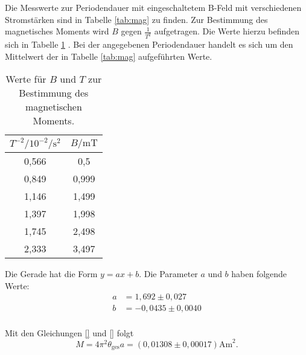 Die Messwerte zur Periodendauer mit eingeschaltetem B-Feld mit verschiedenen Stromstärken sind in Tabelle \ref{tab:mag} zu finden.
Zur Bestimmung des magnetisches Moments wird $B$ gegen $\frac{1}{T^2}$ aufgetragen. Die Werte hierzu befinden sich in Tabelle \ref{tab:mag2} . Bei der angegebenen Periodendauer handelt es sich um den Mittelwert der in Tabelle \ref{tab:mag} aufgeführten Werte.

\begin{table}
  \caption{Werte für $B$ und $T$ zur Bestimmung des magnetischen Moments.}
  \centering
  \label{tab:mag2}
  \begin{tabular}{c c }
    \toprule
    $T^{-2} / 10^{-2} {\si{\per\second\squared}}$ & $B/ \si{\milli\tesla}$ \\
    \midrule
    0,566 & 0,5 \\
    0,849 & 0,999 \\
    1,146 & 1,499 \\
    1,397 & 1,998 \\
    1,745 & 2,498 \\
    2,333 & 3,497 \\
    \bottomrule
    \end{tabular}
    \end{table}


    Die Gerade hat die Form $y=ax+b$. Die Parameter $a$ und $b$ haben folgende Werte:
    \begin{align}
      a&=1,692 \pm 0,027 \\
      b&= -0,0435 \pm 0,0040 \\
    \end{align}

    Mit den Gleichungen \ref{} und \ref{} folgt
    \begin{equation}
      M = 4\pi^2 \theta_\mathrm{ges} a = (0,01308 \pm 0,00017) \si{\ampere \meter}^2.
    \end{equation}
